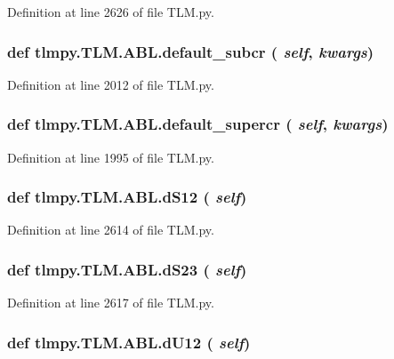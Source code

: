 Definition at line 2626 of file TLM.py.\hypertarget{classtlmpy_1_1TLM_1_1ABL_a9d12805aac8b7780144f3ab777b6a493}{
\subsubsection[{default\_\-subcr}]{\setlength{\rightskip}{0pt plus 5cm}def tlmpy.TLM.ABL.default\_\-subcr ( {\em self}, \/   {\em kwargs})}}
\label{classtlmpy_1_1TLM_1_1ABL_a9d12805aac8b7780144f3ab777b6a493}


Definition at line 2012 of file TLM.py.\hypertarget{classtlmpy_1_1TLM_1_1ABL_a7d8b68025ec06148164a6cec2fea0969}{
\subsubsection[{default\_\-supercr}]{\setlength{\rightskip}{0pt plus 5cm}def tlmpy.TLM.ABL.default\_\-supercr ( {\em self}, \/   {\em kwargs})}}
\label{classtlmpy_1_1TLM_1_1ABL_a7d8b68025ec06148164a6cec2fea0969}


Definition at line 1995 of file TLM.py.\hypertarget{classtlmpy_1_1TLM_1_1ABL_a54266776546fb86c73f531c5e7e03131}{
\subsubsection[{dS12}]{\setlength{\rightskip}{0pt plus 5cm}def tlmpy.TLM.ABL.dS12 ( {\em self})}}
\label{classtlmpy_1_1TLM_1_1ABL_a54266776546fb86c73f531c5e7e03131}


Definition at line 2614 of file TLM.py.\hypertarget{classtlmpy_1_1TLM_1_1ABL_ad3818f14752130abb151b4bbc0edbe81}{
\subsubsection[{dS23}]{\setlength{\rightskip}{0pt plus 5cm}def tlmpy.TLM.ABL.dS23 ( {\em self})}}
\label{classtlmpy_1_1TLM_1_1ABL_ad3818f14752130abb151b4bbc0edbe81}


Definition at line 2617 of file TLM.py.\hypertarget{classtlmpy_1_1TLM_1_1ABL_a7fc8af9afe3c31b702ab35b0d168ce7a}{
\subsubsection[{dU12}]{\setlength{\rightskip}{0pt plus 5cm}def tlmpy.TLM.ABL.dU12 ( {\em self})}}
\label{classtlmpy_1_1TLM_1_1ABL_a7fc8af9afe3c31b702ab35b0d168ce7a}


